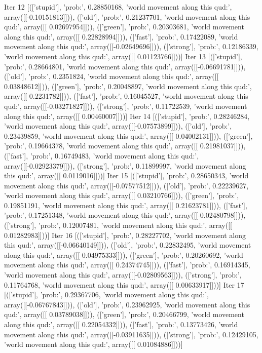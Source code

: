 Iter 12 [(['stupid'], 'prob:', 0.28850168, 'world movement along this qud:', array([[-0.10151813]])), (['old'], 'prob:', 0.21237701, 'world movement along this qud:', array([[ 0.02697954]])), (['green'], 'prob:', 0.20303681, 'world movement along this qud:', array([[ 0.22828994]])), (['fast'], 'prob:', 0.17422089, 'world movement along this qud:', array([[-0.02649696]])), (['strong'], 'prob:', 0.12186339, 'world movement along this qud:', array([[ 0.01123766]]))]
Iter 13 [(['stupid'], 'prob:', 0.28664801, 'world movement along this qud:', array([[-0.06691781]])), (['old'], 'prob:', 0.2351824, 'world movement along this qud:', array([[ 0.03848612]])), (['green'], 'prob:', 0.20048897, 'world movement along this qud:', array([[ 0.2231782]])), (['fast'], 'prob:', 0.16045527, 'world movement along this qud:', array([[-0.03271827]])), (['strong'], 'prob:', 0.11722539, 'world movement along this qud:', array([[ 0.00460007]]))]
Iter 14 [(['stupid'], 'prob:', 0.28246284, 'world movement along this qud:', array([[-0.07573899]])), (['old'], 'prob:', 0.23439859, 'world movement along this qud:', array([[ 0.04002131]])), (['green'], 'prob:', 0.19664378, 'world movement along this qud:', array([[ 0.21981037]])), (['fast'], 'prob:', 0.16749483, 'world movement along this qud:', array([[-0.02923379]])), (['strong'], 'prob:', 0.11899997, 'world movement along this qud:', array([[ 0.0119016]]))]
Iter 15 [(['stupid'], 'prob:', 0.28650343, 'world movement along this qud:', array([[-0.07577512]])), (['old'], 'prob:', 0.22239627, 'world movement along this qud:', array([[ 0.03210766]])), (['green'], 'prob:', 0.19851191, 'world movement along this qud:', array([[ 0.21623781]])), (['fast'], 'prob:', 0.17251348, 'world movement along this qud:', array([[-0.02480798]])), (['strong'], 'prob:', 0.12007481, 'world movement along this qud:', array([[ 0.01282983]]))]
Iter 16 [(['stupid'], 'prob:', 0.28227702, 'world movement along this qud:', array([[-0.06640149]])), (['old'], 'prob:', 0.22832495, 'world movement along this qud:', array([[ 0.04975333]])), (['green'], 'prob:', 0.20260692, 'world movement along this qud:', array([[ 0.24374745]])), (['fast'], 'prob:', 0.16914345, 'world movement along this qud:', array([[-0.02809563]])), (['strong'], 'prob:', 0.11764768, 'world movement along this qud:', array([[ 0.00633917]]))]
Iter 17 [(['stupid'], 'prob:', 0.29367706, 'world movement along this qud:', array([[-0.06767843]])), (['old'], 'prob:', 0.23962925, 'world movement along this qud:', array([[ 0.03789038]])), (['green'], 'prob:', 0.20466799, 'world movement along this qud:', array([[ 0.22054332]])), (['fast'], 'prob:', 0.13773426, 'world movement along this qud:', array([[-0.03911635]])), (['strong'], 'prob:', 0.12429105, 'world movement along this qud:', array([[ 0.01084886]]))]
